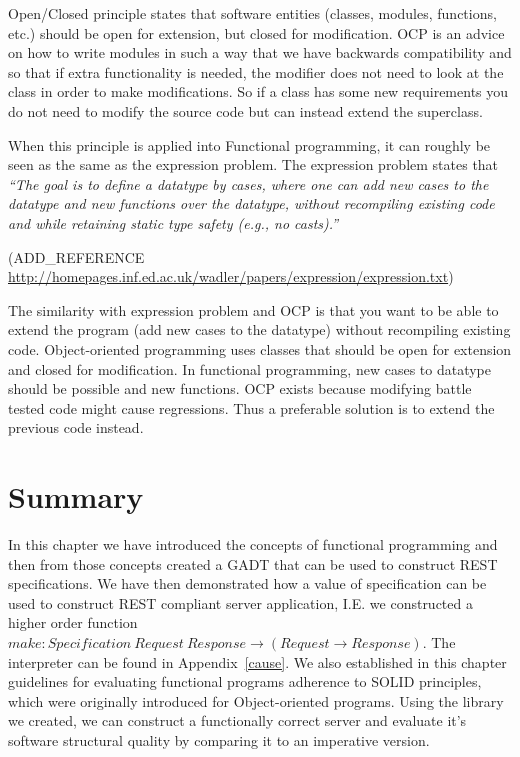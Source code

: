 Open/Closed principle states that software entities (classes, modules,
functions, etc.) should be open for extension, but closed for modification. OCP
is an advice on how to write modules in such a way that we have backwards
compatibility and so that if extra functionality is needed, the modifier does
not need to look at the class in order to make modifications. So if a class has
some new requirements you do not need to modify the source code but can instead
extend the superclass.

When this principle is applied into Functional programming, it can roughly be
seen as the same as the expression problem. The expression problem states that
\textit{``The goal is to define a datatype by cases, where one can add new cases
    to the datatype and new functions over the datatype, without recompiling
existing code and while retaining static type safety (e.g., no casts).''}

(ADD\_REFERENCE \url{http://homepages.inf.ed.ac.uk/wadler/papers/expression/expression.txt})

The similarity with expression problem and OCP is that you want to be able to
extend the program (add new cases to the datatype) without recompiling existing
code.  Object-oriented programming uses classes that should be open for
extension and closed for modification. In functional programming, new cases to
datatype should be possible and new functions. OCP exists because modifying
battle tested code might cause regressions. Thus a preferable solution is to
extend the previous code instead.


\section{Summary}

In this chapter we have introduced the concepts of functional programming and
then from those concepts created a GADT that can be used to construct REST
specifications.  We have then demonstrated how a value of specification can be
used to construct REST compliant server application, I.E. we constructed a
higher order function $make : Specification\ Request\ Response \rightarrow
(Request\rightarrow Response)$. The interpreter can be found in
Appendix~\ref{cause}. We also established in this chapter guidelines for
evaluating functional programs adherence to SOLID principles, which were
originally introduced for Object-oriented programs. Using the library we
created, we can construct a functionally correct server and evaluate it's
software structural quality by comparing it to an imperative version. 
